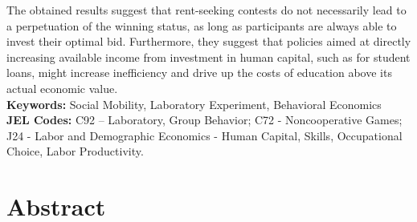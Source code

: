 \begin{small}
The obtained results suggest that rent-seeking contests do not necessarily lead to a perpetuation of the winning status, as long as participants are always able to invest their optimal bid. Furthermore, they suggest that policies aimed at directly increasing available income from investment in human capital, such as for student loans, might increase inefficiency and drive up the costs of education above its actual economic value.\\


\textbf{Keywords:} Social Mobility, Laboratory Experiment, Behavioral Economics\\

\textbf{JEL Codes:} 
C92 – Laboratory, Group Behavior; C72 - Noncooperative Games;
J24 - Labor and Demographic Economics - Human Capital, Skills, Occupational Choice, Labor Productivity.

\end{small}

\chapter*{Abstract}

